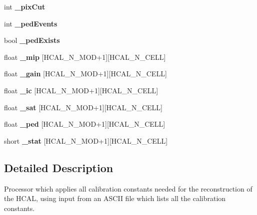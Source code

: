 \begin{DoxyCompactItemize}
\item 
int {\bfseries \-\_\-pix\-Cut}\label{classCALICE_1_1SimpleHcalCalibrationProcessor_ac29276fe392b6ac72b23e0f730f1bfc9}

\item 
int {\bfseries \-\_\-ped\-Events}\label{classCALICE_1_1SimpleHcalCalibrationProcessor_ae6637b017853d6d4e1491bd8298f57dc}

\item 
bool {\bfseries \-\_\-ped\-Exists}\label{classCALICE_1_1SimpleHcalCalibrationProcessor_a41ee5ffb331bf97b272e04bfe99bb4ad}

\item 
float {\bfseries \-\_\-mip} [H\-C\-A\-L\-\_\-\-N\-\_\-\-M\-O\-D+1][H\-C\-A\-L\-\_\-\-N\-\_\-\-C\-E\-L\-L]\label{classCALICE_1_1SimpleHcalCalibrationProcessor_a9e8d5e6713e6076c79867515faa8328a}

\item 
float {\bfseries \-\_\-gain} [H\-C\-A\-L\-\_\-\-N\-\_\-\-M\-O\-D+1][H\-C\-A\-L\-\_\-\-N\-\_\-\-C\-E\-L\-L]\label{classCALICE_1_1SimpleHcalCalibrationProcessor_aa9c38f82b4ea253f1424a994f6dcd1ed}

\item 
float {\bfseries \-\_\-ic} [H\-C\-A\-L\-\_\-\-N\-\_\-\-M\-O\-D+1][H\-C\-A\-L\-\_\-\-N\-\_\-\-C\-E\-L\-L]\label{classCALICE_1_1SimpleHcalCalibrationProcessor_aea9c5a1dbd09fa2ff84ed2b5c900742f}

\item 
float {\bfseries \-\_\-sat} [H\-C\-A\-L\-\_\-\-N\-\_\-\-M\-O\-D+1][H\-C\-A\-L\-\_\-\-N\-\_\-\-C\-E\-L\-L]\label{classCALICE_1_1SimpleHcalCalibrationProcessor_a48ec62665670a867b702f61f8e195e94}

\item 
float {\bfseries \-\_\-ped} [H\-C\-A\-L\-\_\-\-N\-\_\-\-M\-O\-D+1][H\-C\-A\-L\-\_\-\-N\-\_\-\-C\-E\-L\-L]\label{classCALICE_1_1SimpleHcalCalibrationProcessor_a89b5eaa92a71e02127908d83b4915691}

\item 
short {\bfseries \-\_\-stat} [H\-C\-A\-L\-\_\-\-N\-\_\-\-M\-O\-D+1][H\-C\-A\-L\-\_\-\-N\-\_\-\-C\-E\-L\-L]\label{classCALICE_1_1SimpleHcalCalibrationProcessor_a98c972c3f3f4931498d94e2588dc8e09}

\end{DoxyCompactItemize}


\subsection{Detailed Description}
Processor which applies all calibration constants needed for the reconstruction of the H\-C\-A\-L, using input from an A\-S\-C\-I\-I file which lists all the calibration constants. 


